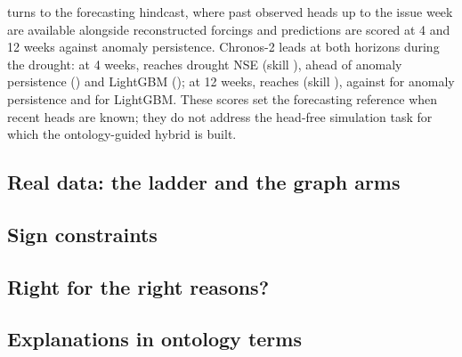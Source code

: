 turns to the forecasting hindcast, where past observed heads up to
the issue week are available alongside reconstructed forcings and predictions are scored at
\num{4} and \num{12} weeks against anomaly persistence. Chronos-2 \citep{Ansari2025Chronos} leads at
both horizons during the drought: at \num{4} weeks, \baselineChronosFourVariant{} reaches drought
NSE \baselineChronosFourDroughtNSE{} (skill \baselineChronosFourDroughtSkill{}), ahead of anomaly
persistence (\baselineAnomalyPersistenceFourDroughtNSE{}) and LightGBM
(\baselineLightGBMFourDroughtNSE{}); at \num{12} weeks, \baselineChronosTwelveVariant{} reaches
\baselineChronosTwelveDroughtNSE{} (skill \baselineChronosTwelveDroughtSkill{}), against
\baselineAnomalyPersistenceTwelveDroughtNSE{} for anomaly persistence and
\baselineLightGBMTwelveDroughtNSE{} for LightGBM. These scores set the forecasting reference when
recent heads are known; they do not address the head-free simulation task for which the
ontology-guided hybrid is built.




\subsection{Real data: the ladder and the graph arms}

\subsection{Sign constraints}

\subsection{Right for the right reasons?}

\subsection{Explanations in ontology terms}
